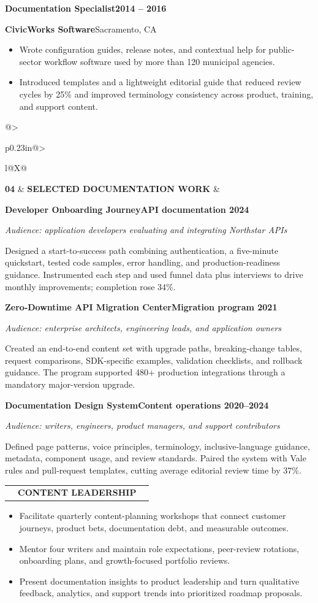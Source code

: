 \documentclass[10pt,letterpaper]{article}
\makeatletter
\newcommand{\resumesection}[2]{%
  \Needspace*{5\baselineskip}%
  \vspace{7pt}%
  \begin{tabularx}{\linewidth}{@{}>{\raggedright\arraybackslash}p{0.23in}@{\hspace{6pt}}>{\raggedright\arraybackslash}l@{\hspace{9pt}}X@{}}
    {\small\bfseries\color{teal}#1} &
    {\large\bfseries\color{navy}#2} &
    \raisebox{0.55ex}{\color{rulegray}\leaders\hrule height 0.7pt\hfill\kern0pt}
  \end{tabularx}%
  \par\vspace{3pt}%
}
\newcommand{\role}[4]{%
  \Needspace*{8\baselineskip}%
  \vspace{3pt}%
  {\large\bfseries\color{navy}#1}\hfill{\small\bfseries\color{ink}#2}\par
  {\bfseries\color{teal}#3}\hfill{\small\color{muted}#4}\par
}
\newcommand{\project}[4]{%
  \Needspace*{6\baselineskip}%
  \vspace{3pt}%
  {\bfseries\color{navy}#1}\hfill{\small\bfseries\color{teal}#2}\par
  {\small\slshape\color{muted}#3}\par
  \vspace{1pt}%
  {\small\color{ink}#4}\par
}
\makeatother
\begin{document}
\role{Documentation Specialist}{2014 -- 2016}{CivicWorks Software}{Sacramento, CA}
\begin{itemize}
  \item Wrote configuration guides, release notes, and contextual help for public-sector workflow software used by more than 120 municipal agencies.
  \item Introduced templates and a lightweight editorial guide that reduced review cycles by 25\% and improved terminology consistency across product, training, and support content.
\end{itemize}

\resumesection{04}{SELECTED DOCUMENTATION WORK}

\project{Developer Onboarding Journey}{API documentation \textbar{} 2024}{Audience: application developers evaluating and integrating Northstar APIs}
{Designed a start-to-success path combining authentication, a five-minute quickstart, tested code samples, error handling, and production-readiness guidance. Instrumented each step and used funnel data plus interviews to drive monthly improvements; completion rose 34\%.}

\project{Zero-Downtime API Migration Center}{Migration program \textbar{} 2021}{Audience: enterprise architects, engineering leads, and application owners}
{Created an end-to-end content set with upgrade paths, breaking-change tables, request comparisons, SDK-specific examples, validation checklists, and rollback guidance. The program supported 480+ production integrations through a mandatory major-version upgrade.}

\project{Documentation Design System}{Content operations \textbar{} 2020--2024}{Audience: writers, engineers, product managers, and support contributors}
{Defined page patterns, voice principles, terminology, inclusive-language guidance, metadata, component usage, and review standards. Paired the system with Vale rules and pull-request templates, cutting average editorial review time by 37\%.}

\resumesection{05}{CONTENT LEADERSHIP}
\begin{itemize}
  \item Facilitate quarterly content-planning workshops that connect customer journeys, product bets, documentation debt, and measurable outcomes.
  \item Mentor four writers and maintain role expectations, peer-review rotations, onboarding plans, and growth-focused portfolio reviews.
  \item Present documentation insights to product leadership and turn qualitative feedback, analytics, and support trends into prioritized roadmap proposals.
\end{itemize}
\end{document}
